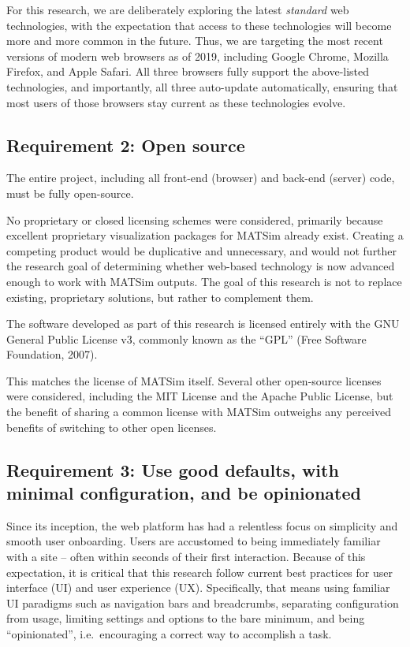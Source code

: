 For this research, we are deliberately exploring the latest
\emph{standard} web technologies, with the expectation that access to
these technologies will become more and more common in the future. Thus,
we are targeting the most recent versions of modern web browsers as of
2019, including Google Chrome, Mozilla Firefox, and Apple Safari. All
three browsers fully support the above-listed technologies, and
importantly, all three auto-update automatically, ensuring that most
users of those browsers stay current as these technologies evolve.

\hypertarget{requirement-2-open-source}{%
\subsection{Requirement 2: Open
source}\label{requirement-2-open-source}}

The entire project, including all front-end (browser) and back-end
(server) code, must be fully open-source.

No proprietary or closed licensing schemes were considered, primarily
because excellent proprietary visualization packages for MATSim already
exist. Creating a competing product would be duplicative and
unnecessary, and would not further the research goal of determining
whether web-based technology is now advanced enough to work with MATSim
outputs. The goal of this research is not to replace existing,
proprietary solutions, but rather to complement them.

The software developed as part of this research is licensed entirely
with the GNU General Public License v3, commonly known as the ``GPL''
(Free Software Foundation, 2007).

This matches the license of MATSim itself. Several other open-source
licenses were considered, including the MIT License and the Apache
Public License, but the benefit of sharing a common license with MATSim
outweighs any perceived benefits of switching to other open licenses.

\hypertarget{requirement-3-use-good-defaults-with-minimal-configuration-and-be-opinionated}{%
\subsection{Requirement 3: Use good defaults, with minimal
configuration, and be
opinionated}\label{requirement-3-use-good-defaults-with-minimal-configuration-and-be-opinionated}}

Since its inception, the web platform has had a relentless focus on
simplicity and smooth user onboarding. Users are accustomed to being
immediately familiar with a site -- often within seconds of their first
interaction. Because of this expectation, it is critical that this
research follow current best practices for user interface (UI) and user
experience (UX). Specifically, that means using familiar UI paradigms
such as navigation bars and breadcrumbs, separating configuration from
usage, limiting settings and options to the bare minimum, and being
``opinionated'', i.e.~encouraging a correct way to accomplish a task.

